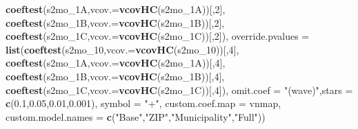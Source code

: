 \documentclass[
]{article}
\newenvironment{Shaded}{\begin{snugshade}}{\end{snugshade}}
\newcommand{\DataTypeTok}[1]{\textcolor[rgb]{0.13,0.29,0.53}{#1}}
\newcommand{\DecValTok}[1]{\textcolor[rgb]{0.00,0.00,0.81}{#1}}
\newcommand{\FloatTok}[1]{\textcolor[rgb]{0.00,0.00,0.81}{#1}}
\newcommand{\KeywordTok}[1]{\textcolor[rgb]{0.13,0.29,0.53}{\textbf{#1}}}
\newcommand{\NormalTok}[1]{#1}
\newcommand{\StringTok}[1]{\textcolor[rgb]{0.31,0.60,0.02}{#1}}
\begin{document}
\begin{Shaded}
\begin{Highlighting}[]
                             \KeywordTok{coeftest}\NormalTok{(s2mo_1A,}\DataTypeTok{vcov.=}\KeywordTok{vcovHC}\NormalTok{(s2mo_1A))[,}\DecValTok{2}\NormalTok{],}
                             \KeywordTok{coeftest}\NormalTok{(s2mo_1B,}\DataTypeTok{vcov.=}\KeywordTok{vcovHC}\NormalTok{(s2mo_1B))[,}\DecValTok{2}\NormalTok{],}
                             \KeywordTok{coeftest}\NormalTok{(s2mo_1C,}\DataTypeTok{vcov.=}\KeywordTok{vcovHC}\NormalTok{(s2mo_1C))[,}\DecValTok{2}\NormalTok{]),}
          \DataTypeTok{override.pvalues =} \KeywordTok{list}\NormalTok{(}\KeywordTok{coeftest}\NormalTok{(s2mo_}\DecValTok{10}\NormalTok{,}\DataTypeTok{vcov.=}\KeywordTok{vcovHC}\NormalTok{(s2mo_}\DecValTok{10}\NormalTok{))[,}\DecValTok{4}\NormalTok{],}
                                  \KeywordTok{coeftest}\NormalTok{(s2mo_1A,}\DataTypeTok{vcov.=}\KeywordTok{vcovHC}\NormalTok{(s2mo_1A))[,}\DecValTok{4}\NormalTok{],}
                                  \KeywordTok{coeftest}\NormalTok{(s2mo_1B,}\DataTypeTok{vcov.=}\KeywordTok{vcovHC}\NormalTok{(s2mo_1B))[,}\DecValTok{4}\NormalTok{],}
                                  \KeywordTok{coeftest}\NormalTok{(s2mo_1C,}\DataTypeTok{vcov.=}\KeywordTok{vcovHC}\NormalTok{(s2mo_1C))[,}\DecValTok{4}\NormalTok{]),}
          \DataTypeTok{omit.coef =} \StringTok{"(wave)"}\NormalTok{,}\DataTypeTok{stars =} \KeywordTok{c}\NormalTok{(}\FloatTok{0.1}\NormalTok{,}\FloatTok{0.05}\NormalTok{,}\FloatTok{0.01}\NormalTok{,}\FloatTok{0.001}\NormalTok{), }\DataTypeTok{symbol =} \StringTok{"+"}\NormalTok{,}
          \DataTypeTok{custom.coef.map =}\NormalTok{ vnmap, }
          \DataTypeTok{custom.model.names =} \KeywordTok{c}\NormalTok{(}\StringTok{"Base"}\NormalTok{,}\StringTok{"ZIP"}\NormalTok{,}\StringTok{"Municipality"}\NormalTok{,}\StringTok{"Full"}\NormalTok{))}
\end{Highlighting}
\end{Shaded}
\end{document}
